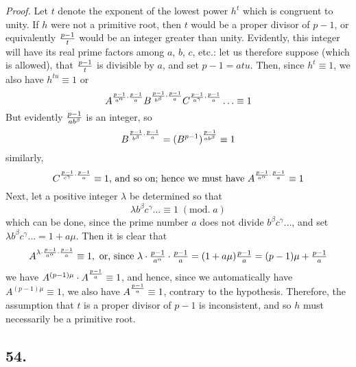\documentclass[twoside,12pt]{memoir}
\renewcommand{\pmod}[1]{\;(\textrm{mod.}\;#1)}
\let\oldfrac\frac
\def\frac#1#2{\mathchoice{\tfrac{#1}{#2}}{\oldfrac{#1}{#2}}{\genfrac{}{}{}{2}{#1}{#2\mathstrut}}{\genfrac{}{}{}{3}{#1}{#2\mathstrut}}}
\begin{document}
\textit{Proof.} Let \(t\) denote the exponent of the lowest power \(h^{t}\) which is congruent to unity. If \(h\) were not a primitive root, then \(t\) would be a proper divisor of \(p-1\), or equivalently \(\frac{p-1}{t}\) would be an integer greater than unity. Evidently, this integer will have its real prime factors among \(a\), \(b\), \(c\), etc{.}: let us therefore suppose (which is allowed), that \(\frac{p-1}{t}\) is divisible by \(a\), and set \(p-1=a t u\). Then, since \(h^{t} \equiv 1\), we also have \(h^{t u} \equiv 1\) or
\[A^{\frac{p-1}{a^{\alpha}} \cdot \frac{p-1}{a}} B^{\frac{p-1}{b^{\beta}} \cdot \frac{p-1}{a}} C^{\frac{p-1}{a^{\gamma}} \cdot \frac{p-1}{a}} \ldots \equiv 1\]
But evidently \(\frac{p-1}{a b^{\beta}}\) is an integer, so
\[B^{\frac{p-1}{b^{\beta}} \cdot \frac{p-1}{a}}=(B^{p-1})^{\frac{p-1}{a b^{\beta}}} \equiv 1\]
similarly,\pagebreak%
\[C^{\frac{p-1}{c^{\gamma}} \cdot \frac{p-1}{a}} \equiv 1\text{, and so on; hence we must have }A^{\frac{p-1}{a^{\alpha}} \cdot \frac{p-1}{a}} \equiv 1\] 
Next, let a positive integer \(\lambda\) be determined so that
\[\lambda b^{\beta} c^{\gamma} \ldots \equiv 1\pmod{a}\]
which can be done, since the prime number \(a\) does not divide \(b^{\beta} c^{\gamma} \ldots\), and set \(\lambda b^{\beta} c^{\gamma} \ldots=1+a \mu\). Then it is clear that
\[ A^{\lambda \cdot \frac{p-1}{a^{\alpha}} \cdot \frac{p-1}{a}} \equiv 1,\text{ or, since }\lambda \cdot \frac{p-1}{a^{\alpha}} \cdot \frac{p-1}{a} = (1+a \mu) \frac{p-1}{a} = (p-1) \mu + \frac{p-1}{a}\]
we have \(A^{(p-1) \mu} \cdot A^{\frac{p-1}{a}} \equiv 1\), and hence, since we automatically have \(A^{(p-1) \mu} \equiv 1\), we also have \(A^{\frac{p-1}{a}} \equiv 1\), contrary to the hypothesis. Therefore, the assumption that \(t\) is a proper divisor of \(p-1\) is inconsistent, and so \(h\) must necessarily be a primitive root.

\subsection*{54.}
\end{document}
